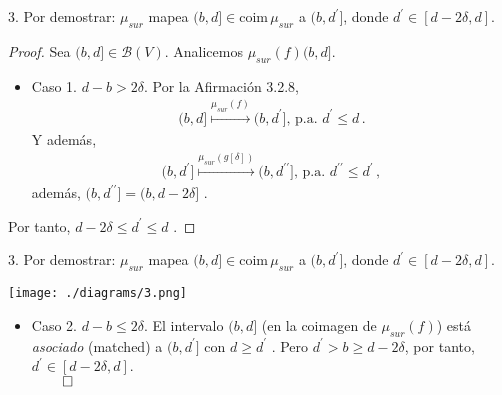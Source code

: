 \documentclass{beamer}
\begin{document}
\begin{frame}{3. Por demostrar: $\mu_{sur}$ mapea $(b, d]\in \mbox{coim}\,\mu_{sur}$ a $(b, d^\prime ]$, donde $d^\prime \in [d - 2\delta, d]$.}
\begin{proof}\renewcommand{\qedsymbol}{}
Sea $(b, d] \in \mathcal{B}(V )$. Analicemos $\mu_{sur} (f )(b, d]$.
\begin{itemize}
\item Caso 1. $d - b > 2\delta$. Por la Afirmaci\'on 3.2.8, 
\begin{gather*}
(b, d] \overset{\mu_{sur}(f)}{\mapsto}  (b, d^\prime ]\mbox{, p.a. }d^\prime \leq d\,.
\end{gather*}
Y adem\'as,
\begin{gather*}
(b, d^{\prime} ] \overset{\mu_{sur}(g[\delta])}{\mapsto}  (b, d^{\prime\prime} ]\mbox{, p.a. }d^{\prime\prime} \leq d^{\prime}\,,
\end{gather*}
adem\'as, $(b, d^{\prime\prime} ] = (b, d - 2\delta]$ .
\end{itemize}
Por tanto, $d - 2\delta\leq d^{\prime}\leq d$ .
\end{proof}
\end{frame}


\begin{frame}{3. Por demostrar: $\mu_{sur}$ mapea $(b, d]\in \mbox{coim}\,\mu_{sur}$ a $(b, d^\prime ]$, donde $d^\prime \in [d - 2\delta, d]$.}
\begin{center}
\texttt{[image: ./diagrams/3.png]}
\end{center}
\begin{itemize}
\item Caso 2. $d - b \leq 2\delta$. El intervalo $(b, d]$ (en la coimagen de $\mu_{sur} (f )$) est\'a \emph{asociado} (matched) a
$(b, d^{\prime} ]$ con $d \geq d^{\prime}$ . Pero $d^{\prime} > b \geq d - 2\delta$, por tanto, $d^{\prime} \in [d - 2\delta, d]$.\\
 $\,\hfill \qed$
\end{itemize}

\end{frame}


\end{document}
